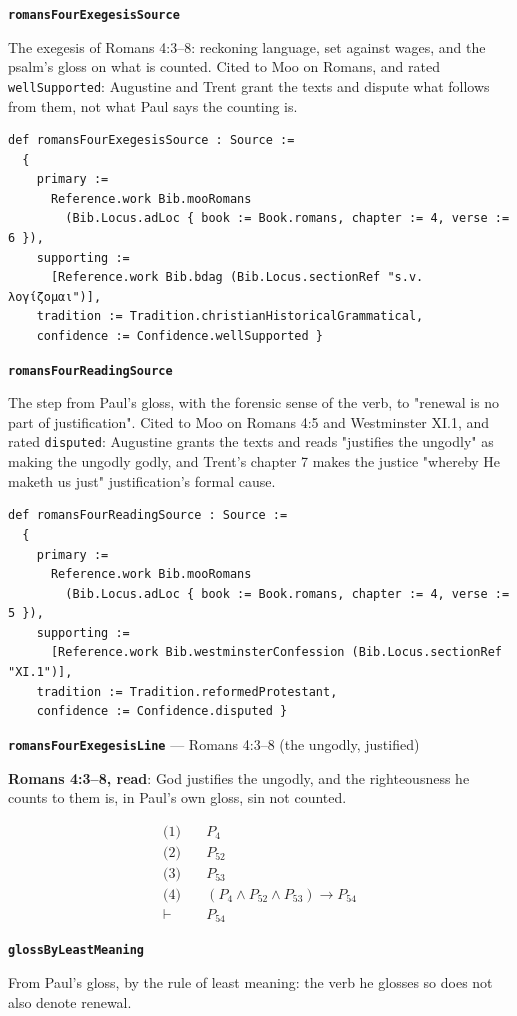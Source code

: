 \documentclass[11pt]{article}
\begin{document}
\par\medskip\noindent\textbf{\texttt{romans\allowbreak{}Four\allowbreak{}Exegesis\allowbreak{}Source}}\par\nobreak\noindent
The exegesis of Romans 4:3–8: reckoning language, set against wages, and the psalm's gloss on what is counted. Cited to Moo on Romans, and rated \texttt{well\allowbreak{}Supported}: Augustine and Trent grant the texts and dispute what follows from them, not what Paul says the counting is.

{\small\begin{verbatim}
def romansFourExegesisSource : Source :=
  {
    primary :=
      Reference.work Bib.mooRomans
        (Bib.Locus.adLoc { book := Book.romans, chapter := 4, verse := 6 }),
    supporting :=
      [Reference.work Bib.bdag (Bib.Locus.sectionRef "s.v. λογίζομαι")],
    tradition := Tradition.christianHistoricalGrammatical,
    confidence := Confidence.wellSupported }
\end{verbatim}}
\par\medskip\noindent\textbf{\texttt{romans\allowbreak{}Four\allowbreak{}Reading\allowbreak{}Source}}\par\nobreak\noindent
The step from Paul's gloss, with the forensic sense of the verb, to "renewal is no part of justification". Cited to Moo on Romans 4:5 and Westminster XI.1, and rated \texttt{disputed}: Augustine grants the texts and reads "justifies the ungodly" as making the ungodly godly, and Trent's chapter 7 makes the justice "whereby He maketh us just" justification's formal cause.

{\small\begin{verbatim}
def romansFourReadingSource : Source :=
  {
    primary :=
      Reference.work Bib.mooRomans
        (Bib.Locus.adLoc { book := Book.romans, chapter := 4, verse := 5 }),
    supporting :=
      [Reference.work Bib.westminsterConfession (Bib.Locus.sectionRef "XI.1")],
    tradition := Tradition.reformedProtestant,
    confidence := Confidence.disputed }
\end{verbatim}}
\par\medskip\noindent\textbf{\texttt{romans\allowbreak{}Four\allowbreak{}Exegesis\allowbreak{}Line}} --- Romans 4:3–8 (the ungodly, justified)\par\nobreak\noindent
\textbf{Romans 4:3–8, read}: God justifies the ungodly, and the righteousness he counts to them is, in Paul's own gloss, sin not counted.

\begin{align*}
  \text{(1)} \quad & P_{4} \\
  \text{(2)} \quad & P_{52} \\
  \text{(3)} \quad & P_{53} \\
  \text{(4)} \quad & (P_{4} \land P_{52} \land P_{53}) \rightarrow P_{54} \\
  \vdash \quad & P_{54}
\end{align*}
\par\medskip\noindent\textbf{\texttt{gloss\allowbreak{}By\allowbreak{}Least\allowbreak{}Meaning}}\par\nobreak\noindent
From Paul's gloss, by the rule of least meaning: the verb he glosses so does not also denote renewal.
\end{document}
